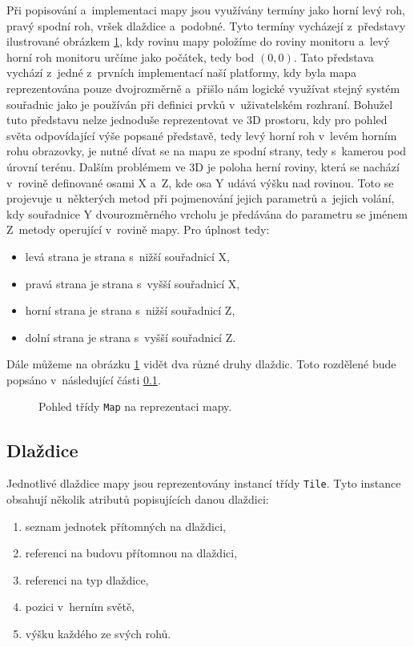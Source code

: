 Při popisování a~implementaci mapy jsou využívány termíny jako horní levý roh, pravý spodní roh, vršek dlaždice a~podobné. Tyto termíny vycházejí z~představy ilustrované obrázkem \ref{fig:mapreprelogic}, kdy rovinu mapy položíme do roviny monitoru a~levý horní roh monitoru určíme jako počátek, tedy bod \((0,0)\). Tato představa vychází z~jedné z~prvních implementací naší platformy, kdy byla mapa reprezentována pouze dvojrozměrně a~přišlo nám logické využívat stejný systém souřadnic jako je používán při definici prvků v~uživatelském rozhraní. Bohužel tuto představu nelze jednoduše reprezentovat ve 3D prostoru, kdy pro pohled světa odpovídající výše popsané představě, tedy levý horní roh v~levém horním rohu obrazovky, je nutné dívat se na mapu ze spodní strany, tedy s~kamerou pod úrovní terénu. Dalším problémem ve 3D je poloha herní roviny, která se nachází v~rovině definované osami X a~Z, kde osa Y udává výšku nad rovinou. Toto se projevuje u~některých metod při pojmenování jejich parametrů a~jejich volání, kdy souřadnice Y dvourozměrného vrcholu je předávána do parametru se jménem Z~metody operující v~rovině mapy. Pro úplnost tedy:

\begin{itemize}
	\item levá strana je strana s~nižší souřadnicí X,
	\item pravá strana je strana s~vyšší souřadnicí X,
	\item horní strana je strana s~nižší souřadnicí Z,
	\item dolní strana je strana s~vyšší souřadnicí Z.
\end{itemize}

Dále můžeme na obrázku \ref{fig:mapreprelogic} vidět dva různé druhy dlaždic. Toto rozdělené bude popsáno v~následující části \ref{sec:tiles}.

\begin{figure}[h]
	\centering
	\fontsize{8pt}{11pt}\selectfont
	\def\svgwidth{\textwidth}
	
	\caption{Pohled třídy \texttt{Map} na reprezentaci mapy.}
	\label{fig:mapreprelogic}
\end{figure}
\subsection{Dlaždice}
\label{sec:tiles}
Jednotlivé dlaždice mapy jsou reprezentovány instancí třídy \texttt{Tile}. Tyto instance obsahují několik atributů popisujících danou dlaždici:

\begin{enumerate}
	\item seznam jednotek přítomných na dlaždici,
	\item referenci na budovu přítomnou na dlaždici,
	\item referenci na typ dlaždice,
	\item pozici v~herním světě,
	\item výšku každého ze svých rohů.
\end{enumerate}

